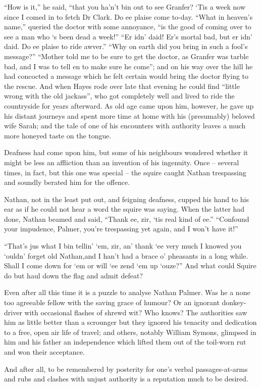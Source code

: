  “How is it,” he said, “that you ha’n’t bin out to see Granfer? ‘Tis a week now since I comed in to fetch Dr Clark. Do ee plaise come to-day.
 “What in heaven’s name,” queried the doctor with some annoyance, “is the good of coming over to see a man who ‘s been dead a week!”
 “Er idn’ daid! Er’s mortal bad, but er idn’ daid. Do ee plaise to ride awver.”
 “Why on earth did you bring in such a fool’s message?”
 “Mother told me to be sure to get the doctor, as Granfer was tarble bad, and I was to tell en to make sure he come”; and on his way over the hill he had concocted a message which he felt certain would bring the doctor flying to the rescue. And when Hayes rode over late that evening he could find “little wrong with the old jackass”, who got completely well and lived to ride the countryside for years afterward.
 As old age came upon him, however, he gave up his distant journeys and spent more time at home with his (presumably) beloved wife Sarah; and the tale of one of his encounters with authority leaves a much more honeyed taste on the tongue.

Deafness had come upon him, but some of his neighbours wondered whether it might be less an affliction than an invention of his ingenuity. Once – several times, in fact, but this one was special – the squire caught Nathan trespassing and soundly berated him for the offence.

Nathan, not in the least put out, and feigning deafness, cupped his hand to his ear as if he could not hear a word the squire was saying. When the latter had done, Nathan beamed and said, “Thank ee, zir, ‘tis real kind of ee.”
 “Confound your impudence, Palmer, you’re trespassing yet again, and I won’t have it!”

 “That’s jus what I bin tellin’ ‘em, zir, an’ thank ‘ee very much I knowed you ‘ouldn’ forget old Nathan,and I han’t had a brace o’ pheasants in a long while. Shall I come down for ‘em or will ‘ee zend ‘em up ‘ouze?”
 And what could Squire do but haul down the flag and admit defeat?
 
 
\Flourish

Even after all this time it is a puzzle to analyse Nathan Palmer. Was he a none too agreeable fellow with the saving grace of humour? Or an ignorant donkey-driver with occasional flashes of shrewd wit? Who knows? The authorities saw him as little better than a scrounger but they ignored his tenacity and dedication to a free, open air life of travel; and others, notably William Symons, glimpsed in him and his father an independence which lifted them out of the toil-worn rut and won their acceptance.

And after all, to be remembered by posterity for one’s verbal passages-at-arms and rubs and clashes with unjust authority is a reputation much to be desired. 